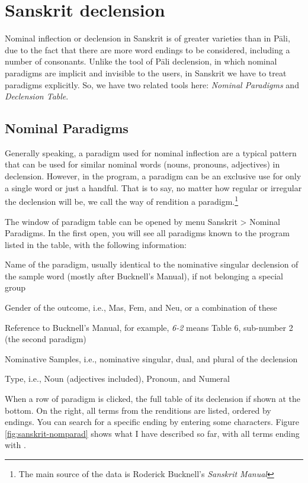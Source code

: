 \chapter{Sanskrit declension}

Nominal inflection or declension in Sanskrit is of greater varieties than in Pāli, due to the fact that there are more word endings to be considered, including a number of consonants. Unlike the tool of Pāli declension, in which nominal paradigms are implicit and invisible to the users, in Sanskrit we have to treat paradigms explicitly. So, we have two related tools here: \emph{Nominal Paradigms} and \emph{Declension Table}.

\section{Nominal Paradigms}

Generally speaking, a paradigm used for nominal inflection are a typical pattern that can be used for similar nominal words (nouns, pronouns, adjectives) in declension. However, in the program, a paradigm can be an exclusive use for only a single word or just a handful. That is to say, no matter how regular or irregular the declension will be, we call the way of rendition a paradigm.\footnote{The main source of the data is Roderick Bucknell's \emph{Sanskrit Manual}}

The window of paradigm table can be opened by menu Sanskrit > {\faSix {}} Nominal Paradigms. In the first open, you will see all paradigms known to the program listed in the table, with the following information:

\begin{compactenum}
\item Name of the paradigm, usually identical to the nominative singular declension of the sample word (mostly after Bucknell's Manual), if not belonging a special group
\item Gender of the outcome, i.e., Mas, Fem, and Neu, or a combination of these
\item Reference to Bucknell's Manual, for example, \emph{6-2} means Table 6, sub-number 2 (the second paradigm)
\item Nominative Samples, i.e., nominative singular, dual, and plural of the declension
\item Type, i.e., Noun (adjectives included), Pronoun, and Numeral
\end{compactenum}

When a row of paradigm is clicked, the full table of its declension if shown at the bottom. On the right, all terms from the renditions are listed, ordered by endings. You can search for a specific ending by entering some characters. Figure \ref{fig:sanskrit-nomparad} shows what I have described so far, with all terms ending with .

